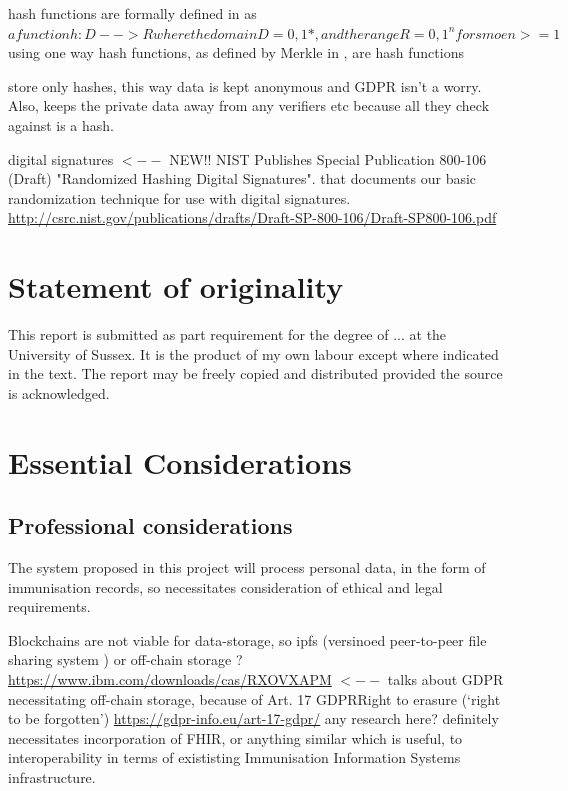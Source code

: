 \documentclass{report}
\begin{document}
\begin{flushleft}
hash functions are formally defined in \cite{rompay_analysis_nodate} as $a function h: D --> R where the domain D = {0,1}*, and the range R = {0,1}^n for smoe n >= 1 $
using one way hash functions, as defined by Merkle in \cite{merkle_secrecy_1979}, are hash functions

store only hashes, this way data is kept anonymous and GDPR isn't a worry. Also, keeps the private data away from any verifiers etc because all they check against is a hash. %

digital signatures  $<--$ NEW!! NIST Publishes Special Publication 800-106 (Draft) "Randomized Hashing Digital Signatures". that documents our basic randomization technique for use with digital signatures. \url{http://csrc.nist.gov/publications/drafts/Draft-SP-800-106/Draft-SP800-106.pdf}


\chapter{Statement of originality}
This report is submitted as part requirement for the degree of ... at the University of Sussex. It is the product of my own labour except where indicated in the text. The report may be freely copied and distributed provided the source is acknowledged.

\chapter{Essential Considerations}

\section{Professional considerations}
The system proposed in this project will process personal data,
in the form of immunisation records, so necessitates
consideration of ethical and legal requirements.

Blockchains are not viable for data-storage, so ipfs (versinoed peer-to-peer file sharing system %
	) or off-chain storage ? \url{https://www.ibm.com/downloads/cas/RXOVXAPM} $<--$ talks about GDPR necessitating off-chain storage, because of Art. 17 GDPRRight to erasure (‘right to be forgotten’) \url{https://gdpr-info.eu/art-17-gdpr/}
any research here? definitely necessitates incorporation of FHIR, or anything similar which is useful, to interoperability in terms of exististing Immunisation Information Systems infrastructure. %


\end{flushleft}
\end{document}
